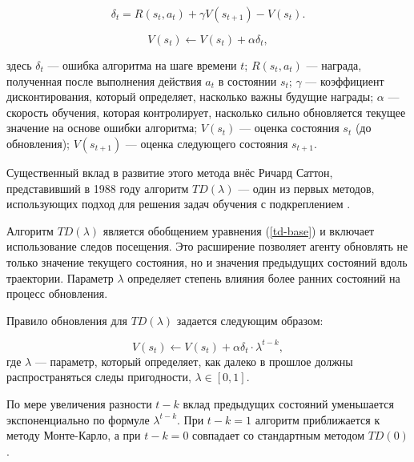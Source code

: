 \begin{equation}\label{td-error}
    \delta_t = R(s_t, a_t) + \gamma V(s_{t+1}) - V(s_t).
\end{equation}

\begin{equation}\label{td-base}
    V(s_t) \leftarrow V(s_t) + \alpha \delta_t,
\end{equation}

здесь $\delta_t$ --- ошибка алгоритма на шаге времени $t$; $R(s_t, a_t)$ --- награда, полученная после выполнения действия $a_t$ в состоянии $s_t$; $\gamma$ --- коэффициент дисконтирования, который определяет, насколько важны будущие награды; $\alpha$ --- скорость обучения, которая контролирует, насколько сильно обновляется текущее значение на основе ошибки алгоритма; $V(s_t)$ --- оценка состояния $s_t$ (до обновления); $V(s_{t+1})$ --- оценка следующего состояния $s_{t+1}$.

Существенный вклад в развитие этого метода внёс Ричард Саттон, представивший в 1988 году алгоритм $TD(\lambda)$ --- один из первых методов, использующих подход для решения задач обучения с подкреплением \cite{td-first-improvement}.

Алгоритм $TD(\lambda)$ является обобщением уравнения (\ref{td-base}) и включает использование следов посещения. Это расширение позволяет агенту обновлять не только значение текущего состояния, но и значения предыдущих состояний вдоль траектории. Параметр $\lambda$ определяет степень влияния более ранних состояний на процесс обновления.

\pagebreak

Правило обновления для $TD(\lambda)$ задается следующим образом:

\begin{equation}\label{td-lambda}
    V(s_t) \leftarrow V(s_t) + \alpha \delta_t \cdot \lambda^{t - k},
\end{equation}
где $\lambda$ --- параметр, который определяет, как далеко в прошлое должны распространяться следы пригодности, $\lambda \in [0, 1]$.

По мере увеличения разности $t - k$ вклад предыдущих состояний уменьшается экспоненциально по формуле $\lambda^{t-k}$. При $t - k = 1$ алгоритм приближается к методу Монте-Карло, а при $t - k = 0$ совпадает со стандартным методом $TD(0)$.
